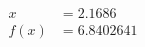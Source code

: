 \documentclass[preview]{standalone}
\begin{document}
\begin{align*}
x &= 2.1686\\f(x) &= 6.8402641
\end{align*}
\end{document}
